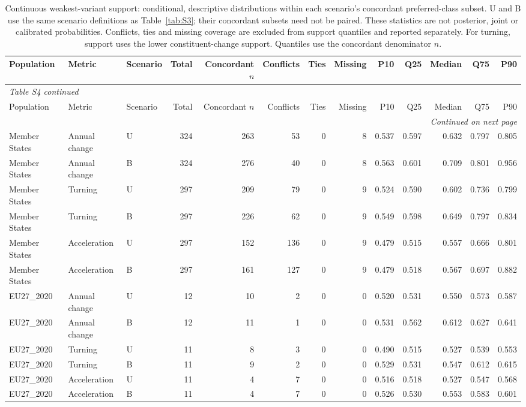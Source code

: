 \begingroup
\footnotesize
\setlength{\tabcolsep}{3pt}
\setlength{\LTcapwidth}{\linewidth}
\renewcommand{\arraystretch}{1.1}
\begin{longtable}{lllrrrrrrrrrr}
\caption{Continuous weakest-variant support: conditional, descriptive distributions within each scenario's concordant preferred-class subset. U and B use the same scenario definitions as Table~\ref{tab:S3}; their concordant subsets need not be paired. These statistics are not posterior, joint or calibrated probabilities. Conflicts, ties and missing coverage are excluded from support quantiles and reported separately. For turning, support uses the lower constituent-change support. Quantiles use the concordant denominator $n$.}\label{tab:S4} \\
\toprule
Population & Metric & Scenario & Total & \shortstack{Concordant\\$n$} & Conflicts & Ties & Missing & P10 & Q25 & Median & Q75 & P90 \\
\midrule
\endfirsthead
\multicolumn{13}{l}{\textit{Table S4 continued}} \\
\toprule
Population & Metric & Scenario & Total & \shortstack{Concordant\\$n$} & Conflicts & Ties & Missing & P10 & Q25 & Median & Q75 & P90 \\
\midrule
\endhead
\midrule
\multicolumn{13}{r}{\textit{Continued on next page}} \\
\endfoot
\bottomrule
\endlastfoot
Member States & Annual change & U & 324 & 263 & 53 & 0 & 8 & 0.537 & 0.597 & 0.632 & 0.797 & 0.805 \\
Member States & Annual change & B & 324 & 276 & 40 & 0 & 8 & 0.563 & 0.601 & 0.709 & 0.801 & 0.956 \\
Member States & Turning & U & 297 & 209 & 79 & 0 & 9 & 0.524 & 0.590 & 0.602 & 0.736 & 0.799 \\
Member States & Turning & B & 297 & 226 & 62 & 0 & 9 & 0.549 & 0.598 & 0.649 & 0.797 & 0.834 \\
Member States & Acceleration & U & 297 & 152 & 136 & 0 & 9 & 0.479 & 0.515 & 0.557 & 0.666 & 0.801 \\
Member States & Acceleration & B & 297 & 161 & 127 & 0 & 9 & 0.479 & 0.518 & 0.567 & 0.697 & 0.882 \\
EU27\_2020 & Annual change & U & 12 & 10 & 2 & 0 & 0 & 0.520 & 0.531 & 0.550 & 0.573 & 0.587 \\
EU27\_2020 & Annual change & B & 12 & 11 & 1 & 0 & 0 & 0.531 & 0.562 & 0.612 & 0.627 & 0.641 \\
EU27\_2020 & Turning & U & 11 & 8 & 3 & 0 & 0 & 0.490 & 0.515 & 0.527 & 0.539 & 0.553 \\
EU27\_2020 & Turning & B & 11 & 9 & 2 & 0 & 0 & 0.529 & 0.531 & 0.547 & 0.612 & 0.615 \\
EU27\_2020 & Acceleration & U & 11 & 4 & 7 & 0 & 0 & 0.516 & 0.518 & 0.527 & 0.547 & 0.568 \\
EU27\_2020 & Acceleration & B & 11 & 4 & 7 & 0 & 0 & 0.526 & 0.530 & 0.553 & 0.583 & 0.601 \\
\end{longtable}

\endgroup
